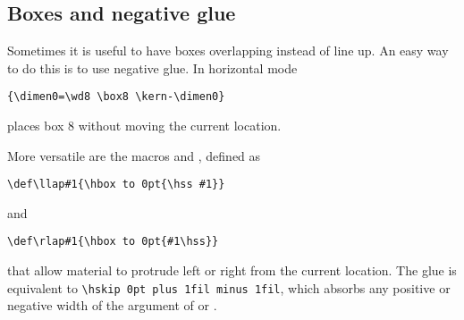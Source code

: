 \documentclass{book}
\begin{document}
\subsection{Boxes and negative glue}

Sometimes it is useful to have boxes overlapping instead of
line up. An easy way to do this is to use negative glue.
In horizontal mode
\begin{verbatim}
{\dimen0=\wd8 \box8 \kern-\dimen0}
\end{verbatim}
places box 8 without moving the current location.

More versatile are the macros  and \label{rlap},
defined as
\begin{verbatim}
\def\llap#1{\hbox to 0pt{\hss #1}}
\end{verbatim}
and
\begin{verbatim}
\def\rlap#1{\hbox to 0pt{#1\hss}}
\end{verbatim}
that allow material to protrude left or right from the
current location.
The  glue is equivalent to \verb>\hskip 0pt plus 1fil minus 1fil>,
which absorbs any positive or negative width
of the argument of  or .
\end{document}
